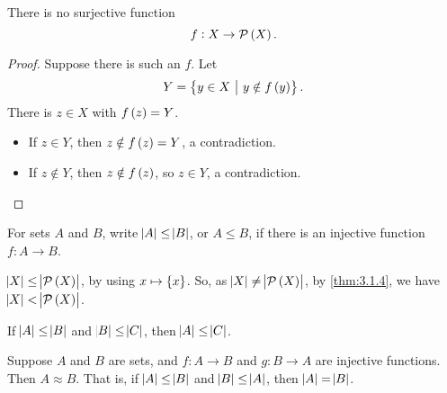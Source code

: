 \begin{theorem}[Cantor]
\label{thm:3.1.4}
There is no surjective function
$$ f : X \to \PPP\br{X}. $$
\end{theorem}

\begin{proof}
Suppose there is such an $ f $. Let
$$ Y = \cbr{y \in X \st y \notin f\br{y}}. $$
There is $ z \in X $ with $ f\br{z} = Y $.
\begin{itemize}
\item If $ z \in Y $, then $ z \notin f\br{z} = Y $, a contradiction.
\item If $ z \notin Y $, then $ z \notin f\br{z} $, so $ z \in Y $, a contradiction.
\end{itemize}
\end{proof}


\begin{definition}
For sets $ A $ and $ B $, write $ \abs{A} \le \abs{B} $, or $ A \le B $, if there is an injective function $ f : A \to B $.
\end{definition}

\begin{note*}
$ \abs{X} \le \abs{\PPP\br{X}} $, by using $ x \mapsto \cbr{x} $. So, as $ \abs{X} \ne \abs{\PPP\br{X}} $, by \ref{thm:3.1.4}, we have $ \abs{X} < \abs{\PPP\br{X}} $.
\end{note*}

\begin{example*}
If $ \abs{A} \le \abs{B} $ and $ \abs{B} \le \abs{C} $, then $ \abs{A} \le \abs{C} $.
\end{example*}

\begin{theorem}
\label{thm:3.1.6}
Suppose $ A $ and $ B $ are sets, and $ f : A \to B $ and $ g : B \to A $ are injective functions. Then $ A \approx B $. That is, if $ \abs{A} \le \abs{B} $ and $ \abs{B} \le \abs{A} $, then $ \abs{A} = \abs{B} $.
\end{theorem}

